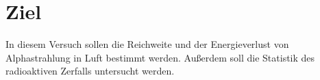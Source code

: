 \section{Ziel}
\label{sec:Ziel}
In diesem Versuch sollen die Reichweite und der Energieverlust von Alphastrahlung in Luft
bestimmt werden. Außerdem soll die Statistik des radioaktiven
Zerfalls untersucht werden.
